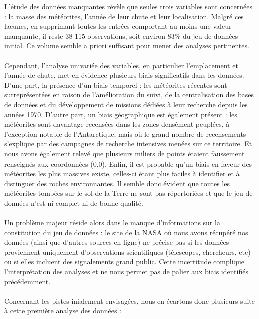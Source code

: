 \documentclass[12pt]{article}
\begin{document}
L’étude des données manquantes révèle que seules trois variables sont concernées : la masse des météorites, l’année de leur chute et leur localisation. Malgré ces lacunes, en supprimant toutes les entrées comportant au moins une valeur manquante, il reste 38 115 observations, soit environ 83\% du jeu de données initial. Ce volume semble a priori suffisant pour mener des analyses pertinentes.\\
\\
Cependant, l’analyse univariée des variables, en particulier l’emplacement et l’année de chute,  met en évidence plusieurs biais significatifs dans les données. D’une part, la présence d'un biais temporel : les météorites récentes sont surreprésentées en raison de l’amélioration du suivi, de la centralisation des bases de données et du développement de missions dédiées à leur recherche depuis les années 1970. D’autre part, un biais géographique est également présent : les météorites sont davantage recensées dans les zones densément peuplées, à l’exception notable de l’Antarctique, mais où  le grand nombre de recensements s'explique par des campagnes de recherche intensives menées sur ce territoire. Et nous avons également relevé que plusieurs miliers de points étaient faussement renseignés aux coordonnées (0,0). Enfin, il est probable qu’un biais en faveur des météorites les plus massives existe, celles-ci étant plus faciles à identifier et à distinguer des roches environnantes. Il semble donc évident que toutes les météorites tombées sur le sol de la Terre ne sont pas répertoriées et que le jeu de données n'est ni complet ni de bonne qualité.\\
\\
Un problème majeur réside alors dans le manque d’informations sur la constitution du jeu de données : le site de la NASA où nous avons récupéré nos données (ainsi que d’autres sources en ligne) ne précise pas si les données proviennent uniquement d’observations scientifiques (télescopes, chercheurs, etc) ou si elles incluent des signalements grand public. Cette incertitude complique l’interprétation des analyses et ne nous permet pas de palier aux biais identifiés précédemment.\\
\\
Concernant les pistes inialement envisagées, nous en écartons donc plusieurs suite à cette première analyse des données :\\
\\
\end{document}

